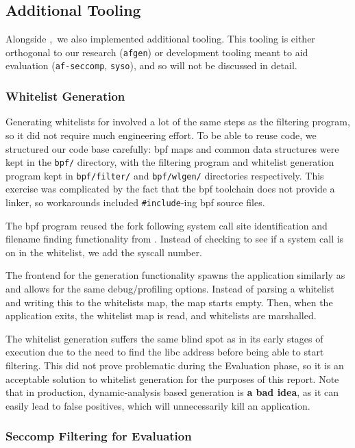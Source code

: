 \subsection{Additional Tooling}

Alongside \afss,~we also implemented additional tooling. This tooling is either
orthogonal to our research (\texttt{afgen}) or development tooling
meant to aid evaluation (\texttt{af-seccomp}, \texttt{syso}), and so will not be
discussed in detail. 

\subsubsection{Whitelist Generation}\label{subsubsec:impl-whitelist-gen}

Generating whitelists for \af involved a lot of the same steps as the filtering
program, so it did not require much engineering effort. To be able to reuse code,
we structured our code base carefully: \ac{bpf} maps and common data structures
were kept in the \texttt{bpf/} directory, with the filtering program and
whitelist generation program kept in \texttt{bpf/filter/} and
\texttt{bpf/wlgen/} directories respectively. This exercise was complicated by
the fact that the \ac{bpf} toolchain does not provide a linker, so workarounds
included \texttt{\#include}-ing \ac{bpf} source files.

The \ac{bpf} program reused the fork following system call site identification and
filename finding functionality from \afss. Instead of checking to see if a
system call is on in the whitelist, we add the syscall number. 

The frontend for the generation functionality spawns the application similarly as \af and allows for the same debug/profiling options. Instead of parsing a
whitelist and writing this to the whitelists map, the map starts empty. Then,
when the application exits, the whitelist map is read, and whitelists are
marshalled.

The whitelist generation suffers the same blind spot as \af in its early stages
of execution due to the need to find the \ac{libc} address before being able to
start filtering. This did not prove problematic during the Evaluation phase, so
it is an acceptable solution to whitelist generation for the purposes of this
report. Note that in production, dynamic-analysis based generation is \textbf{a
bad idea}, as it can easily lead to false positives, which will unnecessarily
kill an application.

\subsubsection{Seccomp Filtering for Evaluation}\label{subsubsec:syso-impl}

